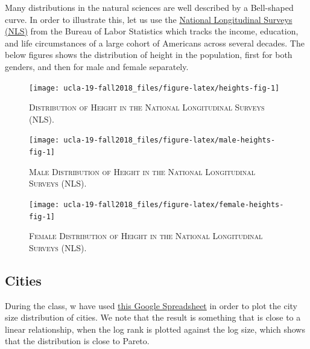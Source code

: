\documentclass[]{book}
\theoremstyle{definition}
\theoremstyle{definition}
\theoremstyle{definition}
\theoremstyle{remark}
\begin{document}
Many distributions in the natural sciences are well described by a
Bell-shaped curve. In order to illustrate this, let us use the
\href{https://www.nlsinfo.org/}{National Longitudinal Surveys (NLS)}
from the Bureau of Labor Statistics which tracks the income, education,
and life circumstances of a large cohort of Americans across several
decades. The below figures shows the distribution of height in the
population, first for both genders, and then for male and female
separately.




\begin{figure}

{\centering \texttt{[image: ucla-19-fall2018\_files/figure-latex/heights-fig-1]} 

}

\caption{\textsc{Distribution of Height in the National
Longitudinal Surveys (NLS)}.}\label{fig:heights-fig}
\end{figure}




\begin{figure}

{\centering \texttt{[image: ucla-19-fall2018\_files/figure-latex/male-heights-fig-1]} 

}

\caption{\textsc{Male Distribution of Height in the
National Longitudinal Surveys (NLS)}.}\label{fig:male-heights-fig}
\end{figure}




\begin{figure}

{\centering \texttt{[image: ucla-19-fall2018\_files/figure-latex/female-heights-fig-1]} 

}

\caption{\textsc{Female Distribution of Height in the
National Longitudinal Surveys (NLS)}.}\label{fig:female-heights-fig}
\end{figure}

\subsection{Cities}\label{cities}

During the class, w have used
\href{https://docs.google.com/spreadsheets/d/1PJ9AjF0kDo-Fe5h3f4eAWZgccIjtn6urpA0Uk4OneXc/edit?usp=sharing}{this
Google Spreadsheet} in order to plot the city size distribution of
cities. We note that the result is something that is close to a linear
relationship, when the log rank is plotted against the log size, which
shows that the distribution is close to Pareto.
\end{document}
